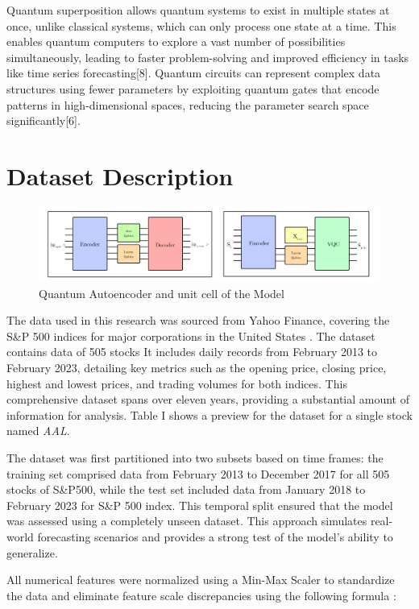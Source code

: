 \documentclass[conference]{IEEEtran}
\begin{document}
Quantum superposition allows quantum systems to exist in multiple states at once, unlike classical systems, which can only process one state at a time. This enables quantum computers to explore a vast number of possibilities simultaneously, leading to faster problem-solving and improved efficiency in tasks like time series forecasting[8]. Quantum circuits can represent complex data structures using fewer parameters by exploiting quantum gates that encode patterns in high-dimensional spaces, reducing the parameter search space significantly[6].

\section{ Dataset Description }
\begin{figure}
    \centering
    \includegraphics[width=1\linewidth]{model.jpg}
    \caption{Quantum Autoencoder and unit cell of the Model}
    \label{fig:enter-label}
\end{figure}
The data used in this research was sourced from Yahoo Finance, covering the S\&P 500 indices for major corporations in the United States \cite{b9}. The dataset contains data of 505 stocks It includes daily records from February 2013 to February 2023, detailing key metrics such as the opening price, closing price, highest and lowest prices, and trading volumes for both indices. This comprehensive dataset spans over eleven years, providing a substantial amount of information for analysis. Table I shows a preview for the dataset for a single stock named \textit{AAL}.

The dataset was first partitioned into two subsets based on time frames: the training set comprised data from February 2013 to December 2017 for all 505 stocks of S\&P500, while the test set included data from January 2018 to February 2023 for S\&P 500 index. This temporal split ensured that the model was assessed using a completely unseen dataset. This approach simulates real-world forecasting scenarios and provides a strong test of the model's ability to generalize.  

All numerical features were normalized using a Min-Max Scaler to standardize the data and eliminate feature scale discrepancies using the following formula \cite{b10}:
\end{document}
